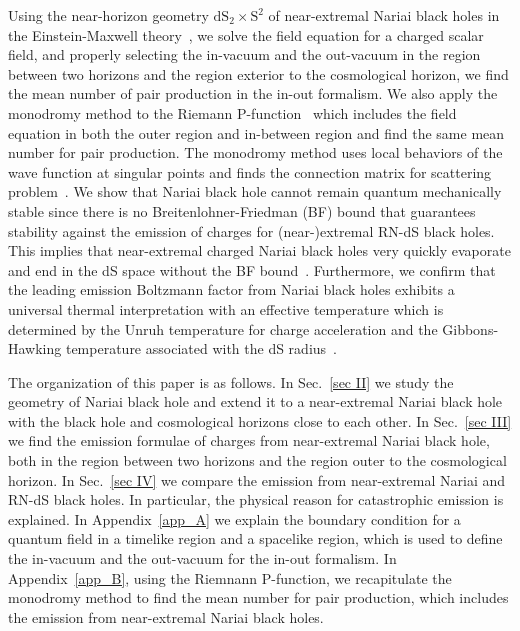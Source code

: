 \documentclass[aps,nofootinbib,superscriptaddress
]{revtex4}
\begin{document}
Using the near-horizon geometry $\mathrm{dS}_2 \times \mathrm{S}^2$ of near-extremal Nariai black holes in the Einstein-Maxwell theory~\cite{Ortaggio:2002bp}, we solve the field equation for a charged scalar field, and properly selecting the in-vacuum and the out-vacuum in the region between two horizons and the region exterior to the cosmological horizon, we find the mean number of pair production in the in-out formalism.
We also apply the monodromy method to the Riemann P-function~\cite{Chen:2022hpe} which includes the field equation in both the outer region and in-between region and find the same mean number for pair production. The monodromy method uses local behaviors of the wave function at singular points and finds the connection matrix for scattering problem~\cite{Castro:2013kea, Castro:2013lba}.
We show that Nariai black hole cannot remain quantum mechanically stable since there is no Breitenlohner-Friedman (BF) bound that guarantees stability against the emission of charges for (near-)extremal RN-dS black holes. This implies that near-extremal charged Nariai black holes very quickly evaporate and end in the dS space without the BF bound~\cite{Montero:2019ekk}.
Furthermore, we confirm that the leading emission Boltzmann factor from Nariai black holes exhibits a universal thermal interpretation with an effective temperature which is determined by the Unruh temperature for charge acceleration and the Gibbons-Hawking temperature associated with the dS radius~\cite{Cai:2014qba}.


The organization of this paper is as follows. In Sec.~\ref{sec II} we study the geometry of Nariai black hole and extend it to a near-extremal Nariai black hole with the black hole and cosmological horizons close to each other. In Sec.~\ref{sec III} we find the emission formulae of charges from near-extremal Nariai black hole, both in the region between two horizons and the region outer to the cosmological horizon. In Sec.~\ref{sec IV} we compare the emission from near-extremal Nariai and RN-dS black holes. In particular, the physical reason for catastrophic emission is explained. In Appendix~\ref{app_A} we explain the boundary condition for a quantum field in a timelike region and a spacelike region, which is used to define the in-vacuum and the out-vacuum for the in-out formalism. In Appendix~\ref{app_B}, using the Riemnann P-function, we recapitulate the monodromy method to find the mean number for pair production, which includes the emission from near-extremal Nariai black holes.
\end{document}
